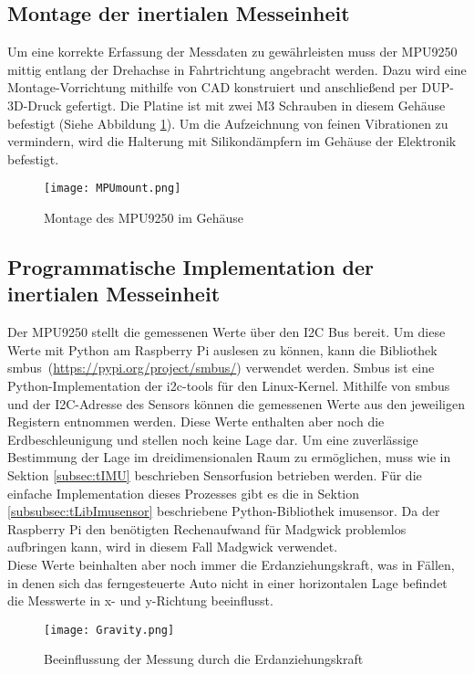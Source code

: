 \subsection{Montage der inertialen Messeinheit}
\label{subsec:IMUmount}
Um eine korrekte Erfassung der Messdaten zu gewährleisten muss der MPU9250 mittig entlang der Drehachse in Fahrtrichtung angebracht werden. Dazu wird eine Montage-Vorrichtung mithilfe von \ac{CAD} konstruiert und anschließend per \ac{DUP}-3D-Druck gefertigt. Die Platine ist mit zwei M3 Schrauben in diesem Gehäuse befestigt (Siehe Abbildung \ref{fig:MPUmount}). Um die Aufzeichnung von feinen Vibrationen zu vermindern, wird die Halterung mit Silikondämpfern im Gehäuse der Elektronik befestigt. 
\newpage
\begin{figure}[h]
\centering
\texttt{[image: MPUmount.png]}
\caption{Montage des MPU9250 im Gehäuse}
\label{fig:MPUmount}
\end{figure}

\subsection{Programmatische Implementation der inertialen Messeinheit}
\label{subsec:IMUprogram}
Der MPU9250 stellt die gemessenen Werte über den \ac{I2C} Bus bereit. Um diese Werte mit Python am Raspberry Pi auslesen zu können, kann die Bibliothek \glqq smbus\grqq \ (\url{https://pypi.org/project/smbus/}) verwendet werden. Smbus ist eine Python-Implementation der i2c-tools für den Linux-Kernel. Mithilfe von smbus und der \ac{I2C}-Adresse des Sensors können die gemessenen Werte aus den jeweiligen Registern entnommen werden. Diese Werte enthalten aber noch die Erdbeschleunigung und stellen noch keine Lage dar. Um eine zuverlässige Bestimmung der Lage im dreidimensionalen Raum zu ermöglichen, muss wie in Sektion \ref{subsec:tIMU} beschrieben Sensorfusion betrieben werden. Für die einfache Implementation dieses Prozesses gibt es die in Sektion \ref{subsubsec:tLibImusensor} beschriebene Python-Bibliothek \glqq imusensor\grqq . Da der Raspberry Pi den benötigten Rechenaufwand für Madgwick problemlos aufbringen kann, wird in diesem Fall Madgwick verwendet. \\
Diese Werte beinhalten aber noch immer die Erdanziehungskraft, was in Fällen, in denen sich das ferngesteuerte Auto nicht in einer horizontalen Lage befindet die Messwerte in x- und y-Richtung beeinflusst.
\newpage
\begin{figure}[h]
\centering
\texttt{[image: Gravity.png]}
\caption{Beeinflussung der Messung durch die Erdanziehungskraft}
\label{fig:Gravity}
\end{figure}

